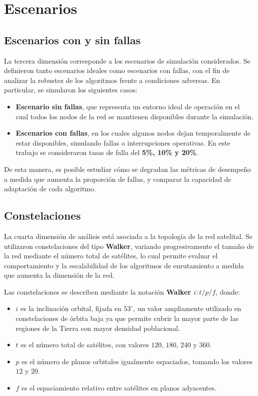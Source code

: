 \section{Escenarios}

\subsection{Escenarios con y sin fallas}

La tercera dimensión corresponde a los escenarios de simulación considerados. Se definieron tanto escenarios ideales como escenarios con fallas, con el fin de analizar la robustez de los algoritmos frente a condiciones adversas. En particular, se simularon los siguientes casos:

\begin{itemize}
    \item \textbf{Escenario sin fallas}, que representa un entorno ideal de operación en el cual todos los nodos de la red se mantienen disponibles durante la simulación.
    \item \textbf{Escenarios con fallas}, en los cuales algunos nodos dejan temporalmente de estar disponibles, simulando fallas o interrupciones operativas. En este trabajo se consideraron tasas de falla del \textbf{5\%, 10\% y 20\%}.
\end{itemize}

De esta manera, es posible estudiar cómo se degradan las métricas de desempeño a medida que aumenta la proporción de fallas, y comparar la capacidad de adaptación de cada algoritmo.

\subsection{Constelaciones}

La cuarta dimensión de análisis está asociada a la topología de la red satelital. Se utilizaron constelaciones del tipo \textbf{Walker}, variando progresivamente el tamaño de la red mediante el número total de satélites, lo cual permite evaluar el comportamiento y la escalabilidad de los algoritmos de enrutamiento a medida que aumenta la dimensión de la red.

Las constelaciones se describen mediante la notación \textbf{Walker $i: t/p/f$}, donde:

\begin{itemize}
    \item $i$ es la inclinación orbital, fijada en $53^\circ$, un valor ampliamente utilizado en constelaciones de órbita baja ya que permite cubrir la mayor parte de las regiones de la Tierra con mayor densidad poblacional.
    \item $t$ es el número total de satélites, con valores $120$, $180$, $240$ y $360$.
    \item $p$ es el número de planos orbitales igualmente espaciados, tomando los valores $12$ y $20$.
    \item $f$ es el espaciamiento relativo entre satélites en planos adyacentes.
\end{itemize}

